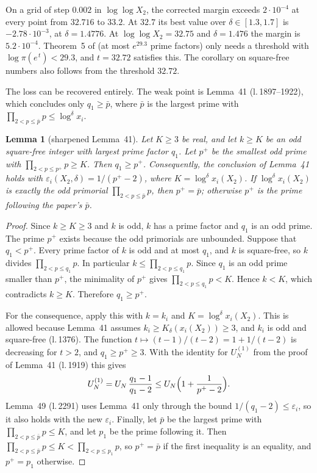 \documentclass[11pt,a4paper]{amsart}
\newtheorem{lemma}[theorem]{Lemma}
\theoremstyle{remark}
\newcommand{\eps}{\varepsilon}
\newcommand{\BJS}{\cite{BJS}}
\begin{document}
On a grid of step $0.002$ in $\log\log X_2$, the corrected margin exceeds $2\cdot10^{-4}$ at every point from
$32.716$ to $33.2$. At $32.7$ its best value over $\delta\in[1.3,1.7]$ is $-2.78\cdot10^{-3}$, at $\delta=1.4776$.
At $\log\log X_2=32.75$ and $\delta=1.476$ the margin is $5.2\cdot10^{-4}$. Theorem~5 of \BJS{} (at most
$e^{29.3}$ prime factors) only needs a threshold with $\log\pi(e^{\,t})<29.3$, and $t=32.72$ satisfies this. The
corollary on square-free numbers also follows from the threshold $32.72$.

The loss can be recovered entirely. The weak point is Lemma~41 (l.\,1897--1922), which concludes only
$q_1\ge\bar p$, where $\bar p$ is the largest prime with $\prod_{2<p\le\bar p}p\le\log^{\delta}x_i$.

\begin{lemma}[sharpened Lemma~41]\label{lem:sharp}
Let $K\ge3$ be real, and let $k\ge K$ be an odd square-free integer with largest prime factor $q_1$. Let
$p^{+}$ be the smallest odd prime with $\prod_{2<p\le p^{+}}p\ge K$. Then $q_1\ge p^{+}$. Consequently, the
conclusion of Lemma~41 holds with $\eps_i(X_2,\delta)=1/(p^{+}-2)$, where $K=\log^{\delta}x_i(X_2)$. If
$\log^{\delta}x_i(X_2)$ is exactly the odd primorial $\prod_{2<p\le\bar p}p$, then $p^{+}=\bar p$; otherwise
$p^{+}$ is the prime following the paper's $\bar p$.
\end{lemma}

\begin{proof}
Since $k\ge K\ge3$ and $k$ is odd, $k$ has a prime factor and $q_1$ is an odd prime. The prime $p^{+}$ exists
because the odd primorials are unbounded. Suppose that $q_1<p^{+}$. Every prime factor of $k$ is odd and at most
$q_1$, and $k$ is square-free, so $k$ divides $\prod_{2<p\le q_1}p$. In particular $k\le\prod_{2<p\le q_1}p$.
Since $q_1$ is an odd prime smaller than $p^{+}$, the minimality of $p^{+}$ gives $\prod_{2<p\le q_1}p<K$.
Hence $k<K$, which contradicts $k\ge K$. Therefore $q_1\ge p^{+}$.

For the consequence, apply this with $k=k_i$ and $K=\log^{\delta}x_i(X_2)$. This is allowed because Lemma~41
assumes $k_i\ge K_\delta(x_i(X_2))\ge3$, and $k_i$ is odd and square-free (l.\,1376). The function
$t\mapsto(t-1)/(t-2)=1+1/(t-2)$ is decreasing for $t>2$, and $q_1\ge p^{+}\ge3$. With the identity for
$U_N^{(1)}$ from the proof of Lemma~41 (l.\,1919) this gives
\[
U_N^{(1)}=U_N\,\frac{q_1-1}{q_1-2}\le U_N\Bigl(1+\frac1{p^{+}-2}\Bigr).
\]
Lemma~49 (l.\,2291) uses Lemma~41 only through the bound $1/(q_1-2)\le\eps_i$, so it also holds with the new
$\eps_i$. Finally, let $\bar p$ be the largest prime with $\prod_{2<p\le\bar p}p\le K$, and let $p_1$ be the
prime following it. Then $\prod_{2<p\le\bar p}p\le K<\prod_{2<p\le p_1}p$, so $p^{+}=\bar p$ if the first
inequality is an equality, and $p^{+}=p_1$ otherwise.
\end{proof}
\end{document}

